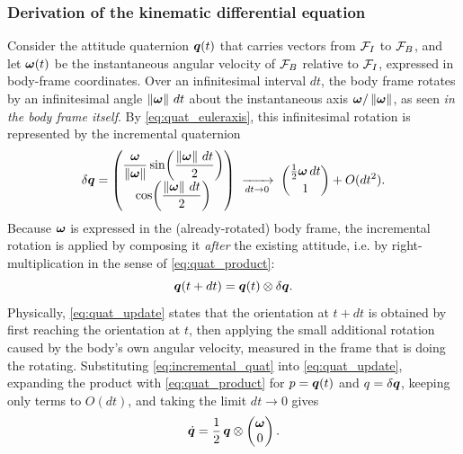 \subsubsection{Derivation of the kinematic differential equation}

Consider the attitude quaternion $\bm{q}(t)$ that carries vectors from $\mathcal{F}_I$ to $\mathcal{F}_B$, and let $\bm{\omega}(t)$ be the instantaneous angular velocity of $\mathcal{F}_B$ relative to $\mathcal{F}_I$, expressed in body-frame coordinates. Over an infinitesimal interval $dt$, the body frame rotates by an infinitesimal angle $\left\lVert \bm{\omega} \right\rVert\,dt$ about the instantaneous axis $\bm{\omega}/\left\lVert \bm{\omega} \right\rVert$, as seen \emph{in the body frame itself}. By \cref{eq:quat_euleraxis}, this infinitesimal rotation is represented by the incremental quaternion
\begin{equation}
    \delta\bm{q} = \begin{pmatrix} \dfrac{\bm{\omega}}{\left\lVert \bm{\omega} \right\rVert}\sin\!\left(\dfrac{\left\lVert \bm{\omega} \right\rVert\,dt}{2}\right) \\[6pt] \cos\!\left(\dfrac{\left\lVert \bm{\omega} \right\rVert\,dt}{2}\right) \end{pmatrix}
    \;\xrightarrow[dt\to 0]{}\;
    \begin{pmatrix} \tfrac{1}{2}\bm{\omega}\,dt \\[2pt] 1 \end{pmatrix} + O(dt^2).
    \label{eq:incremental_quat}
\end{equation}
Because $\bm{\omega}$ is expressed in the (already-rotated) body frame, the incremental rotation is applied by composing it \emph{after} the existing attitude, i.e. by right-multiplication in the sense of \cref{eq:quat_product}:
\begin{equation}
    \bm{q}(t+dt) = \bm{q}(t)\otimes\delta\bm{q}.
    \label{eq:quat_update}
\end{equation}
Physically, \cref{eq:quat_update} states that the orientation at $t+dt$ is obtained by first reaching the orientation at $t$, then applying the small additional rotation caused by the body's own angular velocity, measured in the frame that is doing the rotating. Substituting \cref{eq:incremental_quat} into \cref{eq:quat_update}, expanding the product with \cref{eq:quat_product} for $p=\bm{q}(t)$ and $q = \delta\bm{q}$, keeping only terms to $O(dt)$, and taking the limit $dt\to 0$ gives
\begin{equation}
    \dot{\bm{q}} = \frac{1}{2}\,\bm{q}\otimes\begin{pmatrix}\bm{\omega}\\0\end{pmatrix}.
    \label{eq:quat_kinematics_product}
\end{equation}
